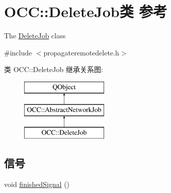 \hypertarget{class_o_c_c_1_1_delete_job}{}\section{O\+CC\+:\+:Delete\+Job类 参考}
\label{class_o_c_c_1_1_delete_job}


The \hyperlink{class_o_c_c_1_1_delete_job}{Delete\+Job} class  




{\ttfamily \#include $<$propagateremotedelete.\+h$>$}

类 O\+CC\+:\+:Delete\+Job 继承关系图\+:\begin{figure}[H]
\begin{center}
\leavevmode
\includegraphics[height=3.000000cm]{class_o_c_c_1_1_delete_job}
\end{center}
\end{figure}
\subsection*{信号}
\begin{DoxyCompactItemize}
\item 
void \hyperlink{class_o_c_c_1_1_delete_job_aedea38cf84339ae970fbc046ab7ade0c}{finished\+Signal} ()
\end{DoxyCompactItemize}
